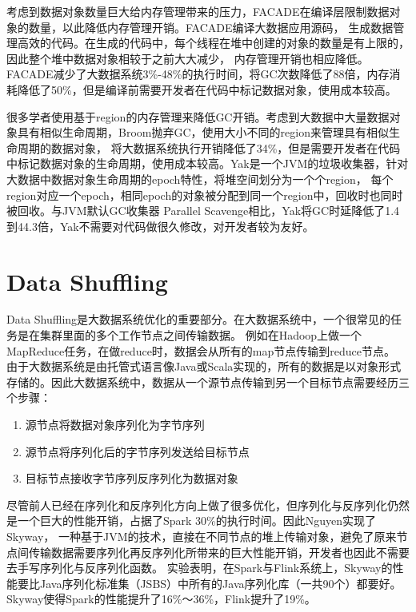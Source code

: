 考虑到数据对象数量巨大给内存管理带来的压力，FACADE\cite{nguyen2015facade}在编译层限制数据对象的数量，以此降低内存管理开销。FACADE编译大数据应用源码，
生成数据管理高效的代码。在生成的代码中，每个线程在堆中创建的对象的数量是有上限的，因此整个堆中数据对象相较于之前大大减少，
内存管理开销也相应降低。FACADE减少了大数据系统3\%-48\%的执行时间，将GC次数降低了88倍，内存消耗降低了50\%，但是编译前需要开发者在代码中标记数据对象，使用成本较高。

很多学者使用基于region的内存管理来降低GC开销。考虑到大数据中大量数据对象具有相似生命周期，Broom\cite{gog2015broom}抛弃GC，使用大小不同的region来管理具有相似生命周期的数据对象，
将大数据系统执行开销降低了34\%，但是需要开发者在代码中标记数据对象的生命周期，使用成本较高。Yak\cite{nguyen2016yak}是一个JVM的垃圾收集器，针对大数据中数据对象生命周期的epoch特性，将堆空间划分为一个个region，
每个region对应一个epoch，相同epoch的对象被分配到同一个region中，回收时也同时被回收。与JVM默认GC收集器 Parallel Scavenge相比，Yak将GC时延降低了1.4到44.3倍，Yak不需要对代码做很久修改，对开发者较为友好。

\section{Data Shuffling}
Data Shuffling是大数据系统优化的重要部分\cite{costa2012camdoop, islam2012high, wang2011hadoop}。在大数据系统中，一个很常见的任务是在集群里面的多个工作节点之间传输数据。
例如在Hadoop上做一个MapReduce任务，在做reduce时，数据会从所有的map节点传输到reduce节点。
由于大数据系统是由托管式语言像Java或Scala实现的，所有的数据是以对象形式存储的。因此大数据系统中，数据从一个源节点传输到另一个目标节点需要经历三个步骤：
\begin{enumerate}
    \item 源节点将数据对象序列化为字节序列
    \item 源节点将序列化后的字节序列发送给目标节点
    \item 目标节点接收字节序列反序列化为数据对象
\end{enumerate}
尽管前人已经在序列化和反序列化方向上做了很多优化，但序列化与反序列化仍然是一个巨大的性能开销，占据了Spark 30\%的执行时间。因此Nguyen实现了Skyway\cite{nguyen2018skyway}，
一种基于JVM的技术，直接在不同节点的堆上传输对象，避免了原来节点间传输数据需要序列化再反序列化所带来的巨大性能开销，开发者也因此不需要去手写序列化与反序列化函数。
实验表明，在Spark与Flink系统上，Skyway的性能要比Java序列化标准集（JSBS）中所有的Java序列化库（一共90个）都要好。Skyway使得Spark的性能提升了16\%～36\%，Flink提升了19\%。

